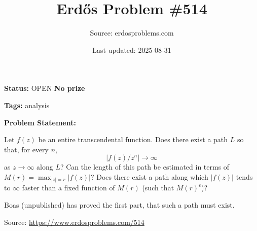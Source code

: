\documentclass{article}
\title{Erd\H{o}s Problem \#514}
\date{Last updated: 2025-08-31}
\author{Source: erdosproblems.com}
\begin{document}
\maketitle

\noindent\textbf{Status:} OPEN \quad \textbf{No prize}

\noindent\textbf{Tags:} analysis

\medskip

\noindent\textbf{Problem Statement:}

Let $f(z)$ be an entire transcendental function. Does there exist a path $L$ so that, for every $n$,\[\lvert f(z)/z^n\rvert \to \infty\]as $z\to \infty$ along $L$? Can the length of this path be estimated in terms of $M(r)=\max_{\lvert z\rvert=r}\lvert f(z)\rvert$? Does there exist a path along which $\lvert f(z)\rvert$ tends to $\infty$ faster than a fixed function of $M(r)$ (such that $M(r)^\epsilon$)?




Boas (unpublished) has proved the first part, that such a path must exist.


\bigskip
\noindent\small{Source: \url{https://www.erdosproblems.com/514}}
\end{document}
